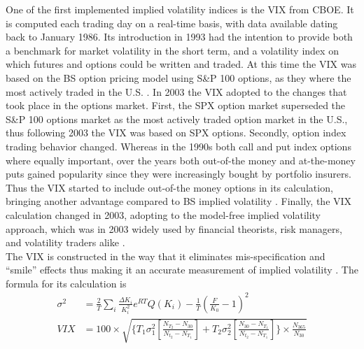 One of the first implemented implied volatility indices is the \ac{VIX} from \ac{CBOE}. It is computed each trading day on a real-time basis, with data available dating back to January 1986. Its introduction in 1993 had the intention to provide both a benchmark for market volatility in the short term, and a volatility index on which futures and options could be written and traded. At this time the \ac{VIX} was based on the \ac{BS} option pricing model using S\&P 100 options, as they where the most actively traded in the U.S. \parencite{whaley1995}. In 2003 the \ac{VIX} adopted to the changes that took place in the options market. First, the \ac{SPX} option market superseded the S\&P 100 options market as the most actively traded option market in the U.S., thus following 2003 the \ac{VIX} was based on \ac{SPX} options. Secondly, option index trading behavior changed. Whereas in the 1990s both call and put index options where equally important, over the years both out-of-the money and at-the-money puts gained popularity since they were increasingly bought by portfolio insurers. Thus the \ac{VIX} started to include out-of-the money options in its calculation, bringing another advantage compared to \ac{BS} implied volatility \parencite{whaley2008}. Finally, the \ac{VIX} calculation changed in 2003, adopting to the model-free implied volatility approach, which was in 2003 widely used by financial theorists, risk managers, and volatility traders alike \parencite{exchange2009}.\\
The \ac{VIX} is constructed in the way that it eliminates mis-specification and ``smile'' effects thus making it an accurate measurement of implied volatility \parencite{blair2001}. The formula for its calculation is
\begin{align}
\sigma^{2} &= \frac{2}{T} \sum_{i} \frac{\Delta K_{i}}{K_{i}^{2}} e^{RT} Q(K_{i}) - \frac{1}{T} (\frac{F}{K_{0}} - 1)^{2} \label{eq:VIXVola}\\
VIX &= 100 \times \sqrt{ \lbrace T_{1}\sigma^{2}_{1}[\frac{N_{T_{2}} - N_{30}}{N_{t_{2}}-N_{T_{1}}}] + T_{2}\sigma^{2}_{2}[\frac{N_{30} - N_{T_{1}}}{N_{t_{2}}-N_{T_{1}}}] \rbrace \times \frac{N_{365}}{N_{30}}} \label{eq:VIX}
\end{align}
